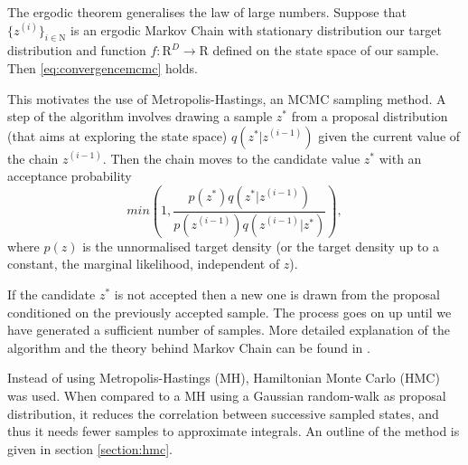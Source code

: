    The ergodic theorem generalises the law of large numbers. Suppose that $\{z^{(i)}\}_{i \in \mathrm{N}}$ is an ergodic Markov Chain with stationary distribution our target distribution and function $f:\mathrm{R}^D \rightarrow \mathrm{R}$ defined on the state space of our sample. Then \eqref{eq:convergencemcmc} holds.
   
   This motivates the use of Metropolis-Hastings, an MCMC sampling method. A step of the algorithm involves drawing a sample $z^*$ from a proposal distribution (that aims at exploring the state space) $q(z^*|z^{(i-1)})$ given the current value of the chain $z^{(i-1)}$. Then the chain moves to the candidate value $z^*$ with an acceptance probability 
   \begin{equation}
   	min\left( 1,\frac{p(z^*)q(z^*|z^{(i-1)})}{p(z^{(i-1)})q(z^{(i-1)}|z^*)}\right),
   \end{equation} 
   where $p(z)$ is the unnormalised target density (or the target density up to a constant, the marginal likelihood, independent of $z$).
   
   If the candidate $z^*$ is not accepted then a new one is drawn from the proposal conditioned on the previously accepted sample. The process goes on up until we have generated a sufficient number of samples. More detailed explanation of the algorithm and the theory behind Markov Chain can be found in \cite{lange_markov_2010}.
   
	Instead of using Metropolis-Hastings (MH), Hamiltonian Monte Carlo (HMC) was used. When compared to a MH using a Gaussian random-walk as proposal distribution, it reduces the correlation between successive sampled states, and thus it needs fewer samples to approximate integrals. An outline of the method is given in section \ref{section:hmc}.
	
	
	
   
%   
%   
%   	
%   
%   

